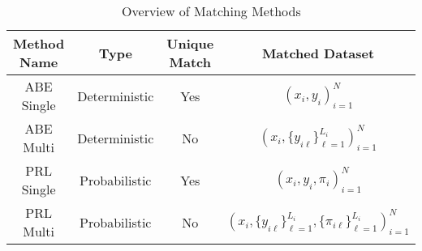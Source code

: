 
\begin{table}[htbp]
\begin{center}
\caption{Overview of Matching Methods}
\vspace{6pt}
\begin{tabular}{cccc}
\toprule
Method Name & Type          & Unique Match & Matched Dataset                                                                           \\
\midrule
ABE Single      & Deterministic & Yes          & $\left(x_i, y_i\right)_{i=1}^N$                                                           \\
ABE Multi       & Deterministic   & No           & $\left(x_i, \{y_{i\ell}\}_{\ell=1}^{L_i}\right)_{i=1}^N$                                  \\
PRL Single      & Probabilistic & Yes          & $\left(x_i, y_i, \pi_i \right)_{i=1}^N$                                                   \\
PRL Multi       & Probabilistic & No           & $\left(x_i, \{y_{i\ell}\}_{\ell=1}^{L_i}, \{\pi_{i\ell}\}_{\ell=1}^{L_i} \right)_{i=1}^N$ \\\bottomrule
\end{tabular}
\label{overview}
\end{center}
\end{table}
